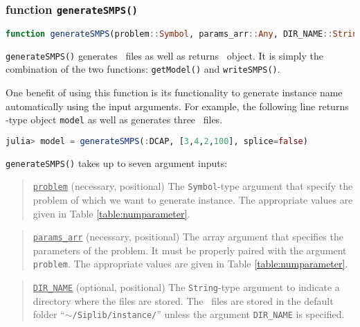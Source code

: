 \subsubsection{function \texttt{generateSMPS()}}

\begin{lstlisting}[frame=single,language=julia]
function generateSMPS(problem::Symbol, params_arr::Any, DIR_NAME::String="$(dirname(@__FILE__))/../instance" ; seed::Int=1, lprelax::Int=0, genericnames::Bool=true, splice::Bool=true)
\end{lstlisting}

\texttt{generateSMPS()} generates \smps\ files as well as returns \jumpmodel\ object. It is simply the combination of the two functions: \texttt{getModel()} and \texttt{writeSMPS()}. 

One benefit of using this function is its functionality to generate instance name automatically using the input arguments. For example, the following line returns \jumpmodel-type object \texttt{model} as well as generates three \smps\ files.
\begin{lstlisting}[frame=single,language=julia]
julia> model = generateSMPS(:DCAP, [3,4,2,100], splice=false)
\end{lstlisting}

\texttt{generateSMPS()} takes up to seven argument inputs:
\begin{quote}
	\noindent\underline{\texttt{problem}} (necessary, positional) The \texttt{Symbol}-type argument that specify the problem of which we want to generate instance. The appropriate values are given in Table \ref{table:numparameter}. 
\end{quote}

\begin{quote}
	\noindent\underline{\texttt{params\_arr}} (necessary, positional) The array argument that specifies the parameters of the problem. It must be properly paired with the argument \texttt{problem}. The appropriate values are given in Table \ref{table:numparameter}. 
\end{quote}

\begin{quote}
	\noindent\underline{\texttt{DIR\_NAME}} (optional, positional) The \texttt{String}-type argument to indicate a directory where the files are stored. The \smps\ files are stored in the default folder ``\texttt{$\sim$/Siplib/instance/}'' unless the argument \texttt{DIR\_NAME} is specified.
\end{quote}

